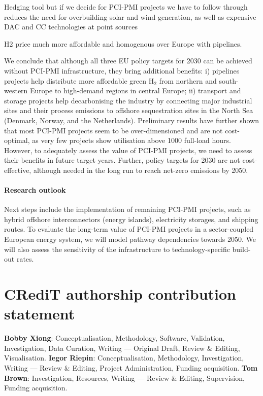 \documentclass[preprint,12pt,sort&compress]{elsarticle}
\begin{document}
Hedging tool
but if we decide for PCI-PMI projects we have to follow through
reduces the need for overbuilding solar and wind generation, as well as expensive DAC and CC technologies at point sources

H2 price much more affordable and homogenous over Europe with pipelines.

We conclude that although all three EU policy targets for 2030 can be achieved without PCI-PMI infrastructure, they bring additional benefits: i)  pipelines projects help distribute more affordable green H$_2$ from northern and south-western Europe to high-demand regions in central Europe; ii)  transport and storage projects help decarbonising the industry by connecting major industrial sites and their process emissions to offshore sequestration sites in the North Sea (Denmark, Norway, and the Netherlands). Preliminary results have further shown that most PCI-PMI projects seem to be over-dimensioned and are not cost-optimal, as very few projects show utilisation above 1000 full-load hours. However, to adequately assess the value of PCI-PMI projects, we need to assess their benefits in future target years. Further, policy targets for 2030 are not cost-effective, although needed in the long run to reach net-zero emissions by 2050.

\paragraph{Research outlook} Next steps include the implementation of remaining PCI-PMI projects, such as hybrid offshore interconnectors (energy islands), electricity storages, and  shipping routes. To evaluate the long-term value of PCI-PMI projects in a sector-coupled European energy system, we will model pathway dependencies towards 2050. We will also assess the sensitivity of the infrastructure to technology-specific build-out rates.


\newpage
\section*{CRediT authorship contribution statement}
\textbf{Bobby Xiong}: Conceptualisation, Methodology, Software, Validation, Investigation, Data Curation, Writing --- Original Draft, Review \& Editing, Visualisation. \textbf{Iegor Riepin}: Conceptualisation, Methodology, Investigation, Writing --- Review \& Editing, Project Administration, Funding acquisition. \textbf{Tom Brown}: Investigation, Resources, Writing --- Review \& Editing, Supervision, Funding acquisition.
\end{document}
